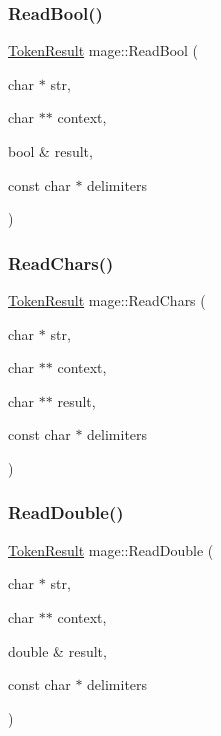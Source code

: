 \hypertarget{namespacemage_af0a37dab7ba4c58335ff1e84d7279c1c}{}\label{namespacemage_af0a37dab7ba4c58335ff1e84d7279c1c} 
\subsubsection{\texorpdfstring{Read\+Bool()}{ReadBool()}}
{\footnotesize\ttfamily \hyperlink{namespacemage_a2178ba2411db5912f41b2e7698c2037d}{Token\+Result} mage\+::\+Read\+Bool (\begin{DoxyParamCaption}\item[{char $\ast$}]{str,  }\item[{char $\ast$$\ast$}]{context,  }\item[{bool \&}]{result,  }\item[{const char $\ast$}]{delimiters }\end{DoxyParamCaption})}

\hypertarget{namespacemage_a5f2717cd5b7cfa9a43396e628e18a5d0}{}\label{namespacemage_a5f2717cd5b7cfa9a43396e628e18a5d0} 
\subsubsection{\texorpdfstring{Read\+Chars()}{ReadChars()}}
{\footnotesize\ttfamily \hyperlink{namespacemage_a2178ba2411db5912f41b2e7698c2037d}{Token\+Result} mage\+::\+Read\+Chars (\begin{DoxyParamCaption}\item[{char $\ast$}]{str,  }\item[{char $\ast$$\ast$}]{context,  }\item[{char $\ast$$\ast$}]{result,  }\item[{const char $\ast$}]{delimiters }\end{DoxyParamCaption})}

\hypertarget{namespacemage_a7ea0807bd21210be516463c68be91cb8}{}\label{namespacemage_a7ea0807bd21210be516463c68be91cb8} 
\subsubsection{\texorpdfstring{Read\+Double()}{ReadDouble()}}
{\footnotesize\ttfamily \hyperlink{namespacemage_a2178ba2411db5912f41b2e7698c2037d}{Token\+Result} mage\+::\+Read\+Double (\begin{DoxyParamCaption}\item[{char $\ast$}]{str,  }\item[{char $\ast$$\ast$}]{context,  }\item[{double \&}]{result,  }\item[{const char $\ast$}]{delimiters }\end{DoxyParamCaption})}

